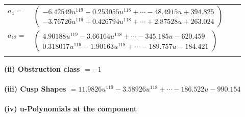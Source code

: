 \documentclass[1p]{elsarticle_modified}
\theoremstyle{definition}
\begin{document}
\begin{tabular}{m{7pt} m{180pt} m{7pt} m{180pt} }
\flushright $a_{4}=$&$\begin{pmatrix}-6.42549 u^{119}-0.253055 u^{118}+\cdots-48.4915 u+394.825\\-3.76726 u^{119}+0.426794 u^{118}+\cdots+2.87528 u+263.024\end{pmatrix}$ \\
\flushright $a_{12}=$&$\begin{pmatrix}4.90188 u^{119}-3.66164 u^{118}+\cdots-345.185 u-620.459\\0.318017 u^{119}-1.90163 u^{118}+\cdots-189.757 u-184.421\end{pmatrix}$\\&\end{tabular}
\flushleft \textbf{(ii) Obstruction class $= -1$}\\~\\
\flushleft \textbf{(iii) Cusp Shapes $= 11.9826 u^{119}-3.58926 u^{118}+\cdots-186.522 u-990.154$}\\~\\
\newpage\renewcommand{\arraystretch}{1}
\flushleft \textbf{(iv) u-Polynomials at the component}\newline \\
\end{document}

